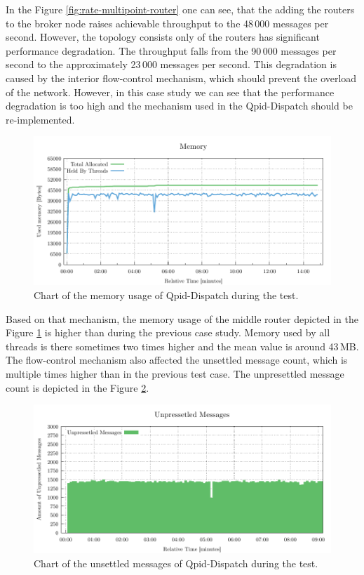 In the Figure \ref{fig:rate-multipoint-router} one can see, that the adding the routers to the broker node raises achievable throughput to the 48\,000 messages per second.  However, the topology consists only of the routers has significant performance degradation. The throughput falls from the 90\,000 messages per second to the approximately 23\,000 messages per second. This degradation is caused by the interior flow-control mechanism, which should prevent the overload of the network. However, in this case study we can see that the performance degradation is too high and the mechanism used in the Qpid-Dispatch should be re-implemented.


\begin{figure}[H]
	\centering
	\includegraphics[width=1\linewidth]{obrazky-figures/charts/multipoint-router-only-throughput-memory.pdf}
	\caption{Chart of the memory usage of Qpid-Dispatch during the test.}
	\label{fig:router-multipoint-memory}
\end{figure}

Based on that mechanism, the memory usage of the middle router depicted in the Figure \ref{fig:router-multipoint-memory} is higher than during the previous case study. Memory used by all threads is there sometimes two times higher and the mean value is around 43\,MB. The flow-control mechanism also affected the unsettled message count, which is multiple times higher than in the previous test case. The unpresettled message count is depicted in the Figure \ref{fig:router-multipoint-routerLink}.

\begin{figure}[H]
	\centering
	\includegraphics[width=1\linewidth]{obrazky-figures/charts/multipoint-router-only-throughput-routerLink.pdf}
	\caption{Chart of the unsettled messages of Qpid-Dispatch during the test.}
	\label{fig:router-multipoint-routerLink}
\end{figure}

